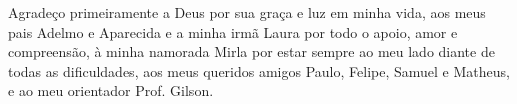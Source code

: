 Agradeço primeiramente a Deus por sua graça e luz em minha vida, aos meus pais Adelmo e Aparecida e a minha irmã Laura por todo o apoio, amor e compreensão, à minha namorada Mirla por estar sempre ao meu lado diante de todas as dificuldades, aos meus queridos amigos Paulo, Felipe, Samuel e Matheus, e ao meu orientador Prof. Gilson.